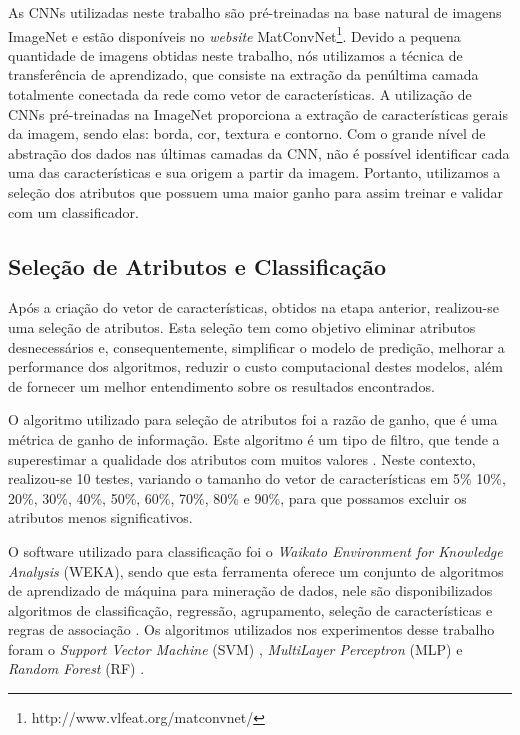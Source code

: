 \documentclass[fleqn,10pt]{SelfArx} %
\begin{document}
As CNNs utilizadas neste trabalho são pré-treinadas na base natural de imagens ImageNet e estão disponíveis no \textit{website} MatConvNet\footnote{http://www.vlfeat.org/matconvnet/}. Devido a pequena quantidade de imagens obtidas neste trabalho, nós utilizamos a técnica de transferência de aprendizado, que consiste na extração da penúltima camada totalmente conectada da rede como vetor de características. A utilização de CNNs pré-treinadas na ImageNet proporciona a extração de características gerais da imagem, sendo elas: borda, cor, textura e contorno. Com o grande nível de abstração dos dados nas últimas camadas da CNN, não é possível identificar cada uma das características e sua origem a partir da imagem. Portanto, utilizamos a seleção dos atributos que possuem uma maior ganho para assim treinar e validar com um classificador.


\subsection{Seleção de Atributos e Classificação}
Após a criação do vetor de características, obtidos na etapa anterior, realizou-se uma seleção de atributos. Esta seleção tem como objetivo eliminar atributos desnecessários e, consequentemente, simplificar o modelo de predição, melhorar a performance dos algoritmos, reduzir o custo computacional destes modelos, além de fornecer um melhor entendimento sobre os resultados encontrados.

O algoritmo utilizado para seleção de atributos foi a razão de ganho, que é uma métrica de ganho de informação. Este algoritmo é um tipo de filtro, que tende a superestimar a qualidade dos atributos com muitos valores \cite{quinlan1986induction}. Neste contexto, realizou-se 10 testes, variando o tamanho do vetor de características em 5\% 10\%, 20\%, 30\%, 40\%, 50\%, 60\%, 70\%, 80\% e 90\%, para que possamos excluir os atributos menos significativos. 

O software utilizado para classificação foi o \textit{Waikato Environment for Knowledge Analysis} (WEKA), sendo que esta ferramenta oferece um conjunto de algoritmos de aprendizado de máquina para mineração de dados, nele são disponibilizados algoritmos de classificação, regressão, agrupamento, seleção de características e regras de associação \cite{hall2009weka}. Os algoritmos utilizados nos experimentos desse trabalho foram o \textit{Support Vector Machine} (SVM) \cite{cortes1995support}, \textit{MultiLayer Perceptron} (MLP)  \cite{rumelhart1985learning} e \textit{Random Forest} (RF) \cite{breiman2001random}.
\end{document}
